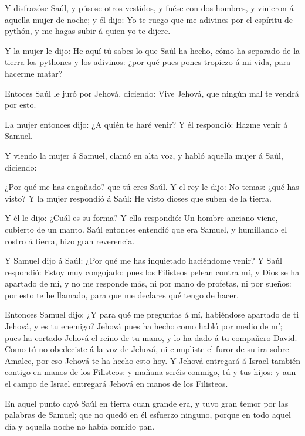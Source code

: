  Y disfrazóse Saúl, y púsose otros vestidos, y fuése con dos
hombres, y vinieron á aquella mujer de noche; y él dijo: Yo te ruego que
me adivines por el espíritu de pythón, y me hagas subir á quien yo te
dijere.

 Y la mujer le dijo: He aquí tú sabes lo que Saúl ha hecho,
cómo ha separado de la tierra los pythones y los adivinos: ¿por qué pues
pones tropiezo á mi vida, para hacerme matar?

 Entoces Saúl le juró por Jehová, diciendo: Vive Jehová,
que ningún mal te vendrá por esto.

 La mujer entonces dijo: ¿A quién te haré venir? Y él
respondió: Hazme venir á Samuel.

 Y viendo la mujer á Samuel, clamó en alta voz, y habló
aquella mujer á Saúl, diciendo:

 ¿Por qué me has engañado? que tú eres Saúl. Y el rey le
dijo: No temas: ¿qué has visto? Y la mujer respondió á Saúl: He visto
dioses que suben de la tierra.

 Y él le dijo: ¿Cuál es su forma? Y ella respondió: Un
hombre anciano viene, cubierto de un manto. Saúl entonces entendió que
era Samuel, y humillando el rostro á tierra, hizo gran reverencia.

 Y Samuel dijo á Saúl: ¿Por qué me has inquietado
haciéndome venir? Y Saúl respondió: Estoy muy congojado; pues los
Filisteos pelean contra mí, y Dios se ha apartado de mí, y no me
responde más, ni por mano de profetas, ni por sueños: por esto te he
llamado, para que me declares qué tengo de hacer.

 Entonces Samuel dijo: ¿Y para qué me preguntas á mí,
habiéndose apartado de ti Jehová, y es tu enemigo?  Jehová
pues ha hecho como habló por medio de mí; pues ha cortado Jehová el
reino de tu mano, y lo ha dado á tu compañero David.  Como
tú no obedeciste á la voz de Jehová, ni cumpliste el furor de su ira
sobre Amalec, por eso Jehová te ha hecho esto hoy.  Y
Jehová entregará á Israel también contigo en manos de los Filisteos: y
mañana seréis conmigo, tú y tus hijos: y aun el campo de Israel
entregará Jehová en manos de los Filisteos.

 En aquel punto cayó Saúl en tierra cuan grande era, y tuvo
gran temor por las palabras de Samuel; que no quedó en él esfuerzo
ninguno, porque en todo aquel día y aquella noche no había comido pan.


